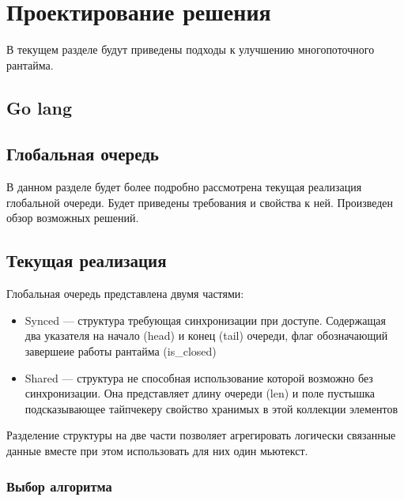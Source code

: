 
\section{Проектирование решения}

В текущем разделе будут приведены подходы к улучшению многопоточного рантайма.

\subsection{Go lang}


\subsection{Глобальная очередь}

В данном разделе будет более подробно рассмотрена текущая реализация глобальной очереди. Будет приведены требования и свойства к ней. Произведен обзор возможных решений.

\subsection{Текущая реализация}

Глобальная очередь представлена двумя частями:

\begin{itemize}
    \item Synced --- структура требующая синхронизации при доступе. Содержащая два указателя на начало (head) и конец (tail) очереди, флаг обозначающий завершеие работы рантайма (is\_closed)
    \item Shared --- структура не способная использование которой возможно без синхронизации. Она представляет длину очереди (len) и поле пустышка подсказывающее тайпчекеру свойство хранимых в этой коллекции элементов
\end{itemize}

Разделение структуры на две части позволяет агрегировать логически связанные данные вместе при этом использовать для них один мьютекст.

\subsubsection{Выбор алгоритма}

